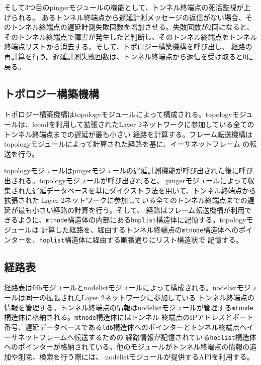 そして3つ目のpingerモジュールの機能として、トンネル終端点の死活監視が上げられる。
あるトンネル終端点から遅延計測メッセージの返信がない場合、そのトンネル終端点の遅延計測失敗回数を増加させる。失敗回数が2回になると、
そのトンネル終端点で障害が発生したと判断し、そのトンネル終端点をトンネル終端点リストから消去する。そして、トポロジー構築機構を呼び出し、
経路の再計算を行う。遅延計測失敗回数は、トンネル終端点から返信を受け取ると0に戻る。


\subsection{トポロジー構築機構}
\label{solv:dijkstra}

トポロジー構築機構はtopologyモジュールによって構成される。topologyモジュールは、leondを利用して拡張されたLayer 2ネットワークに参加している全てのトンネル終端点までの遅延が最も小さい
経路を計算する。フレーム転送機構はtopologyモジュールによって計算された経路を基に、イーサネットフレーム
の転送を行う。

topologyモジュールはpingerモジュールの遅延計測機能が呼び出された後に呼び出される。topologyモジュールが呼び出されると、
pingerモジュールによって収集された遅延データベースを基にダイクストラ法を用いて、トンネル終端点から拡張された
Layer 2ネットワークに参加している全てのトンネル終端点までの遅延が最も小さい経路の計算を行う。そして、
経路はフレーム転送機構が利用できるように、\texttt{mtnode}構造体の内部にある\texttt{hoplist}構造体に記憶する。topologyモジュールは
計算した経路を、経由するトンネル終端点の\texttt{mtnode}構造体へのポインターを、\texttt{hoplist}構造体に経由する順番通りにリスト構造状で
記憶する。

\subsection{経路表}
\label{solv:transfer}

経路表はfdbモジュールとnodelistモジュールによって構成される。nodelistモジュールは同一の拡張されたLayer 2ネットワークに参加している
トンネル終端点の情報を管理する。トンネル終端点の情報はnodelistモジュールが管理する\texttt{mtnode}構造体に格納される。\texttt{mtnode}構造体にはトンネル
終端点のIPアドレスとポート番号、遅延データベースである\texttt{ldb}構造体へのポインターとトンネル終端点へイーサネットフレームへ転送するための
経路情報が記憶されている\texttt{hoplist}構造体へのポインターが格納されている。他のモジュールがトンネル終端点の情報の追加や削除、検索を行う際には、
nodelistモジュールが提供するAPIを利用する。

